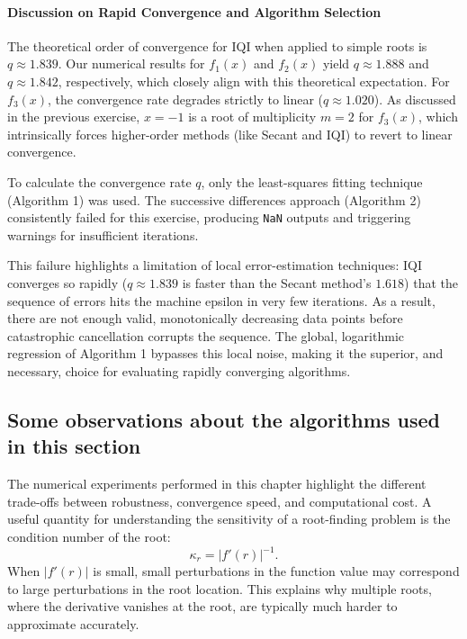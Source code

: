 \begin{solution}
	\paragraph{Discussion on Rapid Convergence and Algorithm Selection}
	The theoretical order of convergence for IQI when applied to simple roots is
	$q \approx 1.839$.
	Our numerical results for $f_1(x)$ and $f_2(x)$ yield $q \approx 1.888$ and
	$q \approx 1.842$, respectively, which closely align with this theoretical
	expectation. For $f_3(x)$, the convergence rate degrades strictly to linear
	($q \approx 1.020$). As discussed in the previous exercise, $x = -1$ is a
	root of multiplicity $m=2$ for $f_3(x)$, which intrinsically forces
	higher-order methods (like Secant and IQI) to revert to linear convergence.

	To calculate the convergence rate $q$, only the least-squares fitting
	technique (Algorithm 1) was used. The successive differences
	approach (Algorithm 2) consistently failed for this exercise,
	producing \texttt{NaN} outputs and triggering warnings for insufficient
	iterations.

	This failure highlights a limitation of local error-estimation techniques:
	IQI converges so rapidly ($q \approx 1.839$ is faster than the Secant
	method's $1.618$) that the sequence of errors hits the machine epsilon
	in very few iterations. As a result, there are not enough valid, monotonically
	decreasing data points before catastrophic cancellation corrupts the sequence.
	The global, logarithmic regression of Algorithm 1 bypasses this local noise,
	making it the superior, and necessary, choice for evaluating rapidly converging
	algorithms.
\end{solution}

\subsection{Some observations about the algorithms used in this section}

The numerical experiments performed in this chapter highlight the different
trade-offs between robustness, convergence speed, and computational cost. A
useful quantity for understanding the sensitivity of a root-finding problem is
the condition number of the root:
\begin{equation*}
	\kappa_r = \left| f'(r) \right|^{-1}.
\end{equation*}
When $\left| f'(r) \right|$ is small, small perturbations in the function value
may correspond to large perturbations in the root location. This explains why
multiple roots, where the derivative vanishes at the root, are typically much
harder to approximate accurately.

